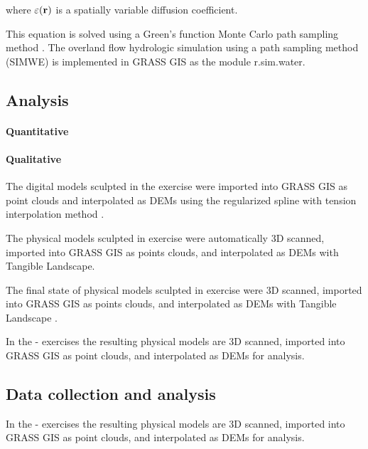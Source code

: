 \documentclass{isprs}
\begin{document}
 where $\varepsilon({\bf r})$ is a spatially variable diffusion coefficient.

This equation is solved using a Green's function Monte Carlo path sampling method \cite{Mitasova2004}.
The overland flow hydrologic simulation using a path sampling method (SIMWE) is implemented in GRASS GIS as the module r.sim.water.




\subsection{Analysis}

\paragraph{Quantitative}

\paragraph{Qualitative}


The digital models sculpted in the  exercise were imported into GRASS GIS as point clouds 
and interpolated as DEMs using the regularized spline with tension interpolation method \cite{Mitasova2005}.

The physical models sculpted in  exercise were automatically 3D scanned, imported into GRASS GIS as points clouds, and interpolated as DEMs
with Tangible Landscape. 

The final state of physical models sculpted in  exercise were 3D scanned, imported into GRASS GIS as points clouds, and interpolated as DEMs
with Tangible Landscape . 



In the - exercises the resulting physical models are 3D scanned, 
imported into GRASS GIS as point clouds, and 
interpolated as DEMs for analysis. 







\subsection{Data collection and analysis}
In the - exercises the resulting physical models are 3D scanned, 
imported into GRASS GIS as point clouds, and 
interpolated as DEMs for analysis. 
\end{document}
